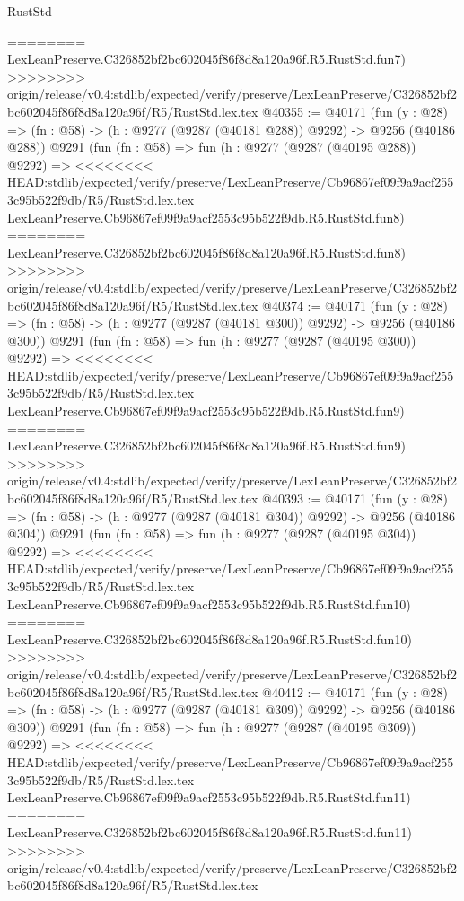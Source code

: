\begin{lexlean}{RustStd}
\begin{coremodule}
{\begin{coremodule}
{{{{{{{{{{{{{{{{{{{{{{{{{{{{{{{{{{{{{{{{{{{{{{{{{{{{{{{========
    LexLeanPreserve.C326852bf2bc602045f86f8d8a120a96f.R5.RustStd.fun7)
>>>>>>>> origin/release/v0.4:stdlib/expected/verify/preserve/LexLeanPreserve/C326852bf2bc602045f86f8d8a120a96f/R5/RustStd.lex.tex
@40355 := @40171
    (fun (y : @28) => (fn : @58) -> (h : @9277 (@9287 (@40181 @288)) @9292) -> @9256 (@40186 @288))
    @9291
    (fun (fn : @58) =>
    fun (h : @9277 (@9287 (@40195 @288)) @9292) =>
<<<<<<<< HEAD:stdlib/expected/verify/preserve/LexLeanPreserve/Cb96867ef09f9a9acf2553c95b522f9db/R5/RustStd.lex.tex
    LexLeanPreserve.Cb96867ef09f9a9acf2553c95b522f9db.R5.RustStd.fun8)
========
    LexLeanPreserve.C326852bf2bc602045f86f8d8a120a96f.R5.RustStd.fun8)
>>>>>>>> origin/release/v0.4:stdlib/expected/verify/preserve/LexLeanPreserve/C326852bf2bc602045f86f8d8a120a96f/R5/RustStd.lex.tex
@40374 := @40171
    (fun (y : @28) => (fn : @58) -> (h : @9277 (@9287 (@40181 @300)) @9292) -> @9256 (@40186 @300))
    @9291
    (fun (fn : @58) =>
    fun (h : @9277 (@9287 (@40195 @300)) @9292) =>
<<<<<<<< HEAD:stdlib/expected/verify/preserve/LexLeanPreserve/Cb96867ef09f9a9acf2553c95b522f9db/R5/RustStd.lex.tex
    LexLeanPreserve.Cb96867ef09f9a9acf2553c95b522f9db.R5.RustStd.fun9)
========
    LexLeanPreserve.C326852bf2bc602045f86f8d8a120a96f.R5.RustStd.fun9)
>>>>>>>> origin/release/v0.4:stdlib/expected/verify/preserve/LexLeanPreserve/C326852bf2bc602045f86f8d8a120a96f/R5/RustStd.lex.tex
@40393 := @40171
    (fun (y : @28) => (fn : @58) -> (h : @9277 (@9287 (@40181 @304)) @9292) -> @9256 (@40186 @304))
    @9291
    (fun (fn : @58) =>
    fun (h : @9277 (@9287 (@40195 @304)) @9292) =>
<<<<<<<< HEAD:stdlib/expected/verify/preserve/LexLeanPreserve/Cb96867ef09f9a9acf2553c95b522f9db/R5/RustStd.lex.tex
    LexLeanPreserve.Cb96867ef09f9a9acf2553c95b522f9db.R5.RustStd.fun10)
========
    LexLeanPreserve.C326852bf2bc602045f86f8d8a120a96f.R5.RustStd.fun10)
>>>>>>>> origin/release/v0.4:stdlib/expected/verify/preserve/LexLeanPreserve/C326852bf2bc602045f86f8d8a120a96f/R5/RustStd.lex.tex
@40412 := @40171
    (fun (y : @28) => (fn : @58) -> (h : @9277 (@9287 (@40181 @309)) @9292) -> @9256 (@40186 @309))
    @9291
    (fun (fn : @58) =>
    fun (h : @9277 (@9287 (@40195 @309)) @9292) =>
<<<<<<<< HEAD:stdlib/expected/verify/preserve/LexLeanPreserve/Cb96867ef09f9a9acf2553c95b522f9db/R5/RustStd.lex.tex
    LexLeanPreserve.Cb96867ef09f9a9acf2553c95b522f9db.R5.RustStd.fun11)
========
    LexLeanPreserve.C326852bf2bc602045f86f8d8a120a96f.R5.RustStd.fun11)
>>>>>>>> origin/release/v0.4:stdlib/expected/verify/preserve/LexLeanPreserve/C326852bf2bc602045f86f8d8a120a96f/R5/RustStd.lex.tex
}}}}}}}}}}}}}}}}}}}}}}}}}}}}}}}}}}}}}}}}}}}}}}}}}}}}}}}
\end{coremodule}}
\end{coremodule}
\end{lexlean}
